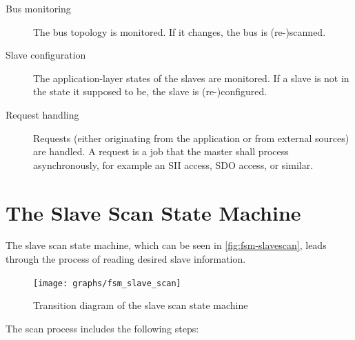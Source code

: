 \documentclass[a4paper,12pt,BCOR6mm,bibtotoc,idxtotoc]{scrbook}
\begin{document}
\begin{description}

\item[Bus monitoring] The bus topology is monitored. If it changes, the bus is
(re-)scanned.

\item[Slave configuration] The application-layer states of the slaves are
monitored. If a slave is not in the state it supposed to be, the slave is
(re-)configured.

\item[Request handling] Requests (either originating from the application or
from external sources) are handled. A request is a job that the master shall
process asynchronously, for example an SII access, SDO access, or similar.

\end{description}


\section{The Slave Scan State Machine}
\label{sec:fsm-scan}

The slave scan state machine, which can be seen in
\autoref{fig:fsm-slavescan}, leads through the process of reading desired
slave information.

\begin{figure}[htbp]
  \centering
  \texttt{[image: graphs/fsm\_slave\_scan]}
  \caption{Transition diagram of the slave scan state machine}
  \label{fig:fsm-slavescan}
\end{figure}

The scan process includes the following steps:
\end{document}
